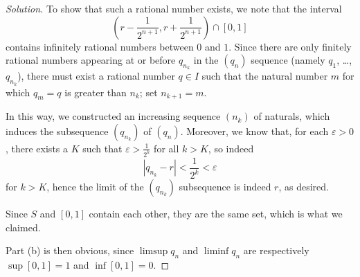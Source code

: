 \documentclass[11pt]{scrartcl}
\providecommand{\eps}{\varepsilon}
\theoremstyle{problem}
\theoremstyle{remark}
\newenvironment{soln}{\begin{proof}[Solution]}{\end{proof}}
\providecommand{\abs}[1]{\left|#1\right|}
\begin{document}
\begin{soln}
	To show that such a rational number exists, we note that the interval
	\[\left(r - \frac{1}{2^{n+1}}, r + \frac{1}{2^{n+1}}\right)
	\cap[0, 1]\]
	contains infinitely rational numbers between $0$ and $1$.
	Since there are only finitely rational numbers
	appearing at or before $q_{n_k}$ in the $(q_n)$ sequence
	(namely $q_1$, \dots, $q_{n_k}$), there must exist a rational number
	$q\in I$ such that the natural number $m$ for which $q_m = q$
	is greater than $n_k$; set $n_{k+1} = m$.
	
	In this way, we constructed an increasing sequence $(n_k)$ of naturals,
	which induces the subsequence $(q_{n_k})$ of $(q_n)$.
	Moreover, we know that, for each $\eps > 0$, there exists a $K$
	such that $\eps > \frac{1}{2^k}$ for all $k > K$, so indeed
	\[\abs{q_{n_k} - r} < \frac{1}{2^k} < \eps\]
	for $k > K$, hence the limit of the $(q_{n_k})$ subsequence
	is indeed $r$, as desired.
	
	Since $S$ and $[0, 1]$ contain each other, they are the same set,
	which is what we claimed.
	
	Part (b) is then obvious, since $\limsup q_n$ and $\liminf q_n$
	are respectively $\sup[0, 1] = 1$ and $\inf[0, 1] = 0$.
\end{soln}
\end{document}
